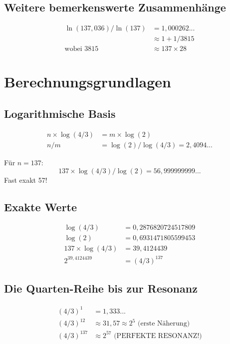 \documentclass[12pt,a4paper]{article}
\begin{document}
	\subsection{Weitere bemerkenswerte Zusammenhänge}
	
	\begin{align}
		\ln(137{,}036) / \ln(137) &= 1{,}000262...\\
		&\approx 1 + 1/3815\\
		\text{wobei } 3815 &\approx 137 \times 28
	\end{align}
	
	\section{Berechnungsgrundlagen}
	
	\subsection{Logarithmische Basis}
	
	\begin{align}
		n \times \log(4/3) &= m \times \log(2)\\
		n/m &= \log(2)/\log(4/3) = 2{,}4094...
	\end{align}
	
	Für $n=137$:
	\begin{equation}
		137 \times \log(4/3) / \log(2) = 56{,}999999999...
	\end{equation}
	Fast exakt 57!
	
	\subsection{Exakte Werte}
	
	\begin{align}
		\log(4/3) &= 0{,}2876820724517809\\
		\log(2) &= 0{,}6931471805599453\\
		137 \times \log(4/3) &= 39{,}4124439\\
		2^{39{,}4124439} &= (4/3)^{137}
	\end{align}
	
	\subsection{Die Quarten-Reihe bis zur Resonanz}
	
	\begin{align}
		(4/3)^1 &= 1{,}333...\\
		(4/3)^{12} &\approx 31{,}57 \approx 2^5 \text{ (erste Näherung)}\\
		(4/3)^{137} &\approx 2^{57} \text{ (PERFEKTE RESONANZ!)}
	\end{align}
	
\end{document}
